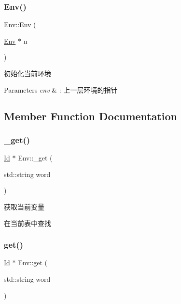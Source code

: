 \subsubsection{\texorpdfstring{Env()}{Env()}}
{\footnotesize\ttfamily Env\+::\+Env (\begin{DoxyParamCaption}\item[{\hyperlink{class_env}{Env} $\ast$}]{n }\end{DoxyParamCaption})}



初始化当前环境 


\begin{DoxyParams}{Parameters}
{\em env} & \+: 上一层环境的指针 \\
\hline
\end{DoxyParams}


\subsection{Member Function Documentation}
\mbox{\label{class_env_aca71253ff9d30153d0834a47cd35a351}} 
\subsubsection{\texorpdfstring{\+\_\+get()}{\_get()}}
{\footnotesize\ttfamily \hyperlink{class_id}{Id} $\ast$ Env\+::\+\_\+get (\begin{DoxyParamCaption}\item[{std\+::string}]{word }\end{DoxyParamCaption})\hspace{0.3cm}{\ttfamily [protected]}}



获取当前变量 

在当前表中查找 \mbox{\label{class_env_a59bbdcdb7af396f6fb6cbff2f828e62b}} 
\subsubsection{\texorpdfstring{get()}{get()}}
{\footnotesize\ttfamily \hyperlink{class_id}{Id} $\ast$ Env\+::get (\begin{DoxyParamCaption}\item[{std\+::string}]{word }\end{DoxyParamCaption})}



